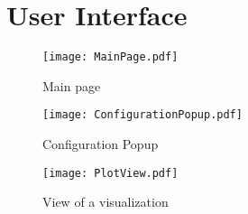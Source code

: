 \section{User Interface}

\begin{figure}[H]
    \texttt{[image: MainPage.pdf]}
    \caption{Main page}
    \label{ui:main}
\end{figure}

\begin{figure}[H]
    \texttt{[image: ConfigurationPopup.pdf]}
    \caption{Configuration Popup}
    \label{ui:config}
\end{figure}

\begin{figure}[H]
    \texttt{[image: PlotView.pdf]}
    \caption{View of a \gls{visualization}}
    \label{ui:plot}
\end{figure}
